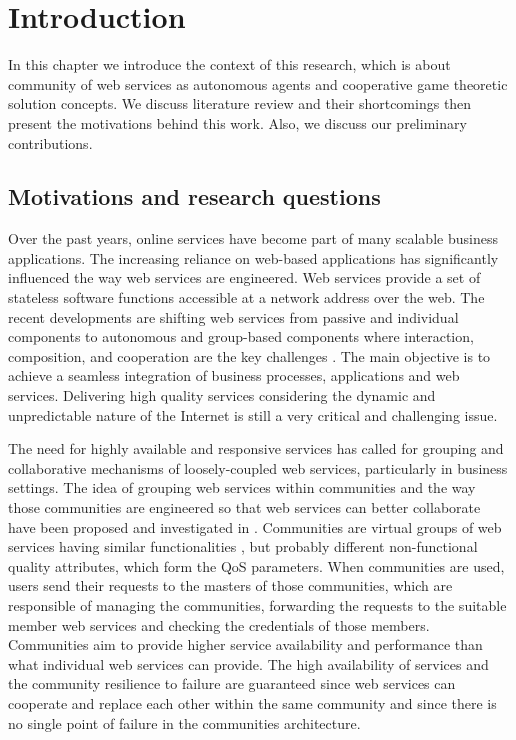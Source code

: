 \setcounter{chapter}{0}
\chapter{Introduction}\label{sec:intro}
In this chapter we introduce the context of this research, which is about community of web services as autonomous agents and cooperative game theoretic solution concepts. We discuss literature review and their shortcomings then present the motivations behind this work. Also, we discuss our preliminary contributions.

\section{Motivations and research questions}\label{sec:motivation}

Over the past years, online services have become part of many
scalable business applications. The increasing reliance on
web-based applications has significantly influenced the way web
services are engineered. Web services provide a set of stateless
software functions accessible at a network address over the web.
The recent developments are shifting web services from passive and
individual components to autonomous and group-based components
where interaction, composition, and cooperation are the key
challenges \cite{ICWS2011-1,SCC2011-1}. The main objective is to
achieve a seamless integration of business processes, applications
and web services. Delivering high quality services considering the
dynamic and unpredictable nature of the Internet is still a very
critical and challenging issue.

The need for highly available and responsive services has called
for grouping and collaborative mechanisms of loosely-coupled web
services, particularly in business settings. The idea of grouping
web services within communities and the way those communities are
engineered so that web services can better collaborate have been
proposed and investigated in
\cite{DBLP:journals/ijebr/MaamarSTBB09,DBLP:journals/internet/BenatallahSD03,Rosario:2008:PQS:1512146.1512290}.
Communities are virtual groups of web services having similar
functionalities \cite{Zeng:2003:QDW:775152.775211, Paik:2005:TSS:2229263.2230038,Medjahed05adynamic,10.1109/ARES.2008.7}, but probably different non-functional quality
attributes, which form the QoS parameters. When communities are
used, users send their requests to the masters of those
communities, which are responsible of managing the communities,
forwarding the requests to the suitable member web services and
checking the credentials of those members. Communities aim to
provide higher service availability and performance than what
individual web services can provide. The high availability of
services and the community resilience to failure are guaranteed
since web services can cooperate and replace each other within the
same community and since there is no single point of failure in
the communities architecture.

